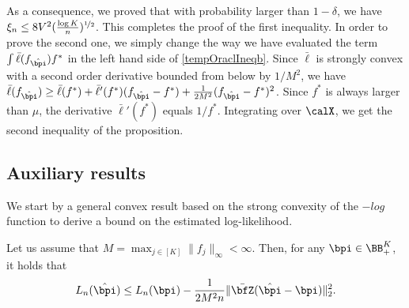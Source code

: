 As a consequence, we proved that with probability larger than $1-\delta$, we have
$\xi_n\le 8V^2(\frac{\log K}{n})^{\nicefrac12}$. This completes the proof of the first inequality.
In order to prove the second one, we simply change the way we have evaluated the term
$\int \bar\ell(f_{\hat\bpi})f^*$ in the left hand side of \eqref{tempOraclIneqb}. Since
$\bar\ell$ is strongly convex with a second order derivative bounded from below by $1/M^2$, we
have $\bar\ell(f_{\hat\bpi})\ge \bar\ell(f^*) + \bar\ell'(f^*)(f_{\hat\bpi}-f^*)+
\frac1{2M^2}(f_{\hat\bpi}-f^*)^2$. Since $f^*$ is always larger than $\mu$, the derivative
$\bar\ell'(f^*)$ equals $1/f^*$. Integrating over $\calX$, we get the second inequality of
the proposition.


\subsection{Auxiliary results}\label{ssec:auxiliary}


We start by a general convex result based on the strong convexity of the $-log$ function to
derive a bound on the estimated log-likelihood.
\begin{lemma}{}
\label{convexlemma}
Let us assume that $M =\max_{j\in[K]}\|f_j\|_\infty<\infty$. Then, for any $\bpi\in \BB^K_+$, it holds that
\begin{equation}
L_n(\hat\bpi) \le L_n(\bpi) -\frac1{2M^2n}\|\bar\bfZ(\hat\bpi-\bpi)\|_2^2.
\end{equation}
\end{lemma}

